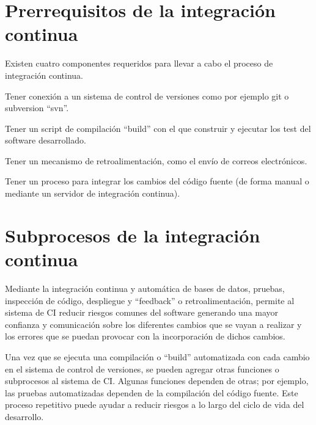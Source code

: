 \section{Prerrequisitos de la integración continua}
Existen cuatro componentes requeridos para llevar a cabo el proceso de integración continua.
\begin{compactitem}
    \item Tener conexión a un sistema de control de versiones como por ejemplo git o subversion ``svn''.
    \item Tener un script de compilación ``build'' con el que construir y ejecutar los test del software desarrollado.
    \item Tener un mecanismo de retroalimentación, como el envío de correos electrónicos.
    \item Tener un proceso para integrar los cambios del código fuente (de forma manual o mediante un servidor de integración continua).
\end{compactitem}

\section{Subprocesos de la integración continua}
Mediante la integración continua y automática de bases de datos, pruebas, inspección de código, despliegue y ``feedback'' o retroalimentación, permite al sistema de CI reducir riesgos comunes del software generando una mayor confianza y comunicación sobre los diferentes cambios que se vayan a realizar y los errores que se puedan provocar con la incorporación de dichos cambios. 

Una vez que se ejecuta una compilación o ``build'' automatizada con cada cambio en el sistema de control de versiones, se pueden agregar otras funciones o subprocesos al sistema de CI. Algunas funciones dependen de otras; por ejemplo, las pruebas automatizadas dependen de la compilación del código fuente. Este proceso repetitivo puede ayudar a reducir riesgos a lo largo del ciclo de vida del desarrollo.

